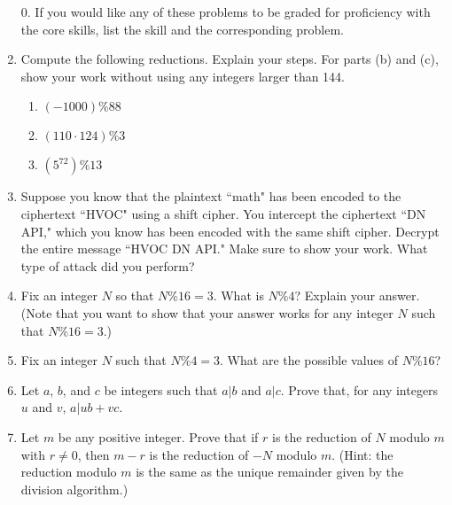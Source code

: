 \documentclass[12pt]{article}
\begin{document}
\begin{enumerate}
\item[0.] If you would like any of these problems to be graded for proficiency with the core skills, list the skill and the corresponding problem.
\item Compute the following reductions.  Explain your steps.  For parts (b) and (c), show your work without using any integers larger than 144. 
\begin{multicols}{3}
\begin{enumerate}
\item $(-1000) \% 88$
\item $(110\cdot 124) \% 3$ 
\item $\left(5^{72}\right) \% 13$ 
\end{enumerate}
\end{multicols}
\item Suppose you know that the plaintext ``math" has been encoded to the ciphertext ``HVOC" using a shift cipher.  You intercept the ciphertext ``DN API," which you know has been encoded with the same shift cipher.  Decrypt the entire message ``HVOC DN API." Make sure to show your work.   What type of attack did you perform?
\item Fix an integer $N$ so that $N\%16 = 3$.  What is $N\%4$?  Explain your answer. (Note that you want to show that your answer works for any integer $N$ such that $N\%16=3$.)

\item Fix an integer $N$ such that $N\%4=3$. What are the possible values of $N\%16$?

\item Let $a$, $b$, and $c$ be integers such that $a|b$ and $a|c$. Prove that,  for any integers $u$ and $v$, $a|ub+vc$. 

\item Let $m$ be any positive integer. Prove that  if $r$ is the reduction of $N$ modulo $m$ with $r\ne 0$, then $m-r$ is the reduction of $-N$ modulo $m$. (Hint: the reduction modulo $m$ is the same as the unique remainder given by the division algorithm.)

\end{enumerate}
\end{document}
